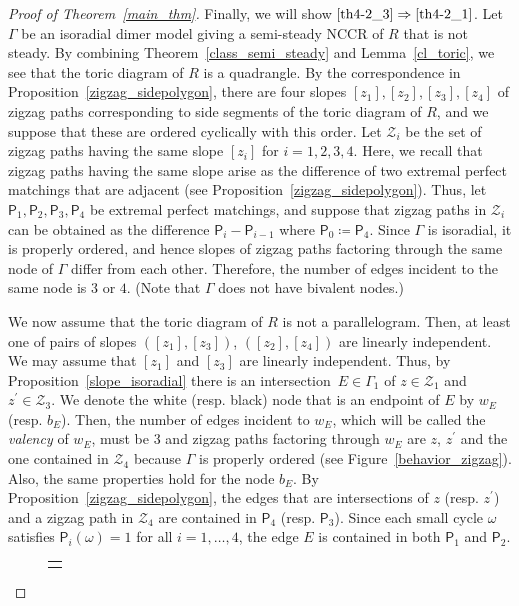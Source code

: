 \documentclass[11pt]{amsart}
\theoremstyle{definition}
\newcommand{\calZ}{\mathcal{Z}}
\newcommand{\sfP}{\mathsf{P}}
\begin{document}
\begin{proof}[Proof of Theorem~\ref{main_thm}]
Finally, we will show $\eqref{th4-2_3}\Rightarrow\eqref{th4-2_1}$.
Let $\Gamma$ be an isoradial dimer model giving a semi-steady NCCR of $R$ that is not steady. By combining Theorem~\ref{class_semi_steady} and Lemma~\ref{cl_toric}, we see that the toric diagram of $R$ is a quadrangle. By the correspondence in Proposition~\ref{zigzag_sidepolygon}, there are four slopes $[z_1], [z_2],[z_3], [z_4]$ of zigzag paths corresponding to side segments of the toric diagram of $R$, and we suppose that these are ordered cyclically with this order. Let $\calZ_i$ be the set of zigzag paths having the same slope $[z_i]$ for $i=1,2,3,4$. Here, we recall that zigzag paths having the same slope arise as the difference of two extremal perfect matchings that are adjacent (see Proposition~\ref{zigzag_sidepolygon}). Thus, let $\sfP_1,\sfP_2, \sfP_3, \sfP_4$ be extremal perfect matchings, and suppose that zigzag paths in $\calZ_i$ can be obtained as the difference $\sfP_i-\sfP_{i-1}$ where $\sfP_0\coloneqq\sfP_4$. Since $\Gamma$ is isoradial, it is properly ordered, and hence slopes of zigzag paths factoring through the same node of $\Gamma$ differ from each other. Therefore, the number of edges incident to the same node is $3$ or $4$. (Note that $\Gamma$ does not have bivalent nodes.)

We now assume that the toric diagram of $R$ is not a parallelogram. Then, at least one of pairs of slopes $([z_1], [z_3])$, $([z_2], [z_4])$ are linearly independent. We may assume that $[z_1]$ and $[z_3]$ are linearly independent. Thus, by Proposition~\ref{slope_isoradial} there is an intersection~$E\in\Gamma_1$ of $z\in\calZ_1$ and $z^\prime\in\calZ_3$. We denote the white (resp. black) node that is an endpoint of $E$ by $w_E$ (resp. $b_E$). Then, the number of edges incident to $w_E$, which will be called the \emph{valency} of $w_E$, must be $3$ and zigzag paths factoring through $w_E$ are $z$, $z^\prime$ and the one contained in $\calZ_4$ because $\Gamma$ is properly ordered (see Figure~\ref{behavior_zigzag}). Also, the same properties hold for the node $b_E$. By Proposition~\ref{zigzag_sidepolygon}, the edges that are intersections of $z$ (resp. $z^\prime$) and a zigzag path in $\calZ_4$ are contained in $\sfP_4$ (resp. $\sfP_3$). Since each small cycle $\omega$ satisfies $\sfP_i(\omega)=1$ for all $i=1,\dots,4$, the edge $E$ is contained in both $\sfP_1$ and $\sfP_2$.

\begin{figure}[H]
\begin{tabular}{@{}c@{}}
\begin{minipage}{0.5 \hsize}
\begin{center}
{\scalebox{0.7}{
\begin{tikzpicture}
\newcommand{\edgewidth}{0.05cm}
\newcommand{\nodewidth}{0.05cm}
\newcommand{\noderad}{0.16}


\end{tikzpicture}}}
\end{center}
\end{minipage}
\end{tabular}
\end{figure}
\end{proof}
\end{document}
